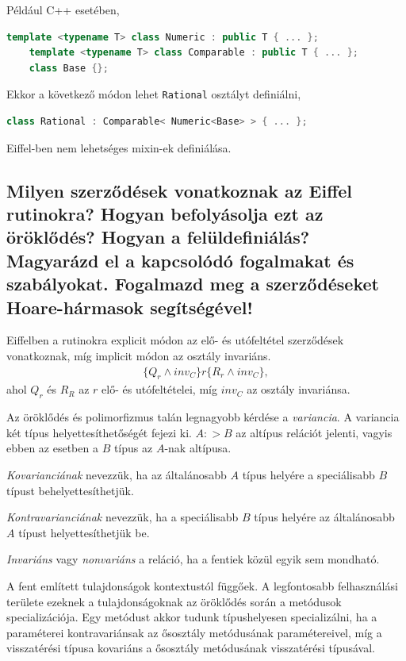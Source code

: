 	
	Például C++ esetében,
	\begin{lstlisting}[language=C++]
	template <typename T> class Numeric : public T { ... };
	template <typename T> class Comparable : public T { ... };
	class Base {};
	\end{lstlisting}
	Ekkor a következő módon lehet \lstinline[language=C++]|Rational| osztályt definiálni,
	\begin{lstlisting}[language=C++]
	class Rational : Comparable< Numeric<Base> > { ... };
	\end{lstlisting}
	
	Eiffel-ben nem lehetséges mixin-ek definiálása.

\subsection{ Milyen szerződések vonatkoznak az Eiffel rutinokra? Hogyan befolyásolja ezt az öröklődés? Hogyan a felüldefiniálás? Magyarázd el a kapcsolódó fogalmakat és szabályokat. Fogalmazd meg a szerződéseket Hoare-hármasok segítségével! }\label{öröklődés}
	Eiffelben a rutinokra explicit módon az elő- és utófeltétel szerződések vonatkoznak, míg implicit módon az osztály invariáns.
	\begin{align*}
	\{Q_r \wedge inv_C\} r \{R_r \wedge inv_C\},
	\end{align*}
	ahol $Q_r$ és $R_R$ az $r$ elő- és utófeltételei, míg $inv_C$ az osztály invariánsa.
	
	Az öröklődés és polimorfizmus talán legnagyobb kérdése a \textit{variancia}. A variancia két típus helyettesíthetőségét fejezi ki. $A :> B$ az altípus relációt jelenti, vagyis ebben az esetben a $B$ típus az $A$-nak altípusa.
	
	\textit{Kovarianciának} nevezzük, ha az általánosabb $A$ típus helyére a speciálisabb $B$ típust behelyettesíthetjük.
	
	\textit{Kontravarianciának} nevezzük, ha a speciálisabb $B$ típus helyére az általánosabb $A$ típust helyettesíthetjük be.
	
	\textit{Invariáns} vagy \textit{nonvariáns} a reláció, ha a fentiek közül egyik sem mondható.
	
	A fent említett tulajdonságok kontextustól függőek. A legfontosabb felhasználási területe ezeknek a tulajdonságoknak az öröklődés során a metódusok specializációja. Egy metódust akkor tudunk típushelyesen specializálni, ha a paraméterei kontravariánsak az ősosztály metódusának paramétereivel, míg a visszatérési típusa kovariáns a ősosztály metódusának visszatérési típusával.
	
